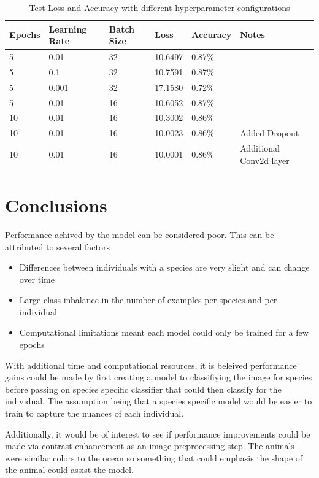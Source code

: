 \documentclass{article}
\begin{document}
\begin{table}[ht]
\centering
\begin{tabularx}{\textwidth}{|X|X|X|X|X|X|}
\hline
\textbf{Epochs} & \textbf{Learning Rate} & \textbf{Batch Size} & \textbf{Loss} & \textbf{Accuracy} & \textbf{Notes} \\
\hline
5 & 0.01 & 32 & 10.6497 & 0.87\% & \\
\hline
5 & 0.1 & 32 & 10.7591 & 0.87\% &  \\
\hline
5 & 0.001 & 32 & 17.1580 & 0.72\% & \\
\hline
5 & 0.01 & 16 & 10.6052 & 0.87\% & \\
\hline
10 & 0.01 & 16 & 10.3002 & 0.86\% & \\
\hline
10 & 0.01 & 16 & 10.0023 & 0.86\% & Added Dropout \\
\hline
10 & 0.01 & 16 & 10.0001 & 0.86\% & Additional Conv2d layer \\



\hline
\end{tabularx}
\caption{Test Loss and Accuracy with different hyperparameter configurations}
\label{tab:example}
\end{table}

\section{Conclusions}

Performance achived by the model can be considered poor. This can be attributed to several factors

\begin{itemize}
    \item Differences between individuals with a species are very slight and can change over time
    \item Large class inbalance in the number of examples per species and per individual
    \item Computational limitations meant each model could only be trained for a few epochs
\end{itemize}

With additional time and computational resources, it is beleived performance gains could be made by first creating a model to classifiying the image for 
species before passing on species specific classifier that could then classify for the individual. The assumption being that a species specific model would
be easier to train to capture the nuances of each individual.


Additionally, it would be of interest to see if performance improvements could be made via contrast enhancement as an image preprocessing step. The animals were 
similar colors to the ocean so something that could emphasis the shape of the animal could assist the model.





\end{document}
